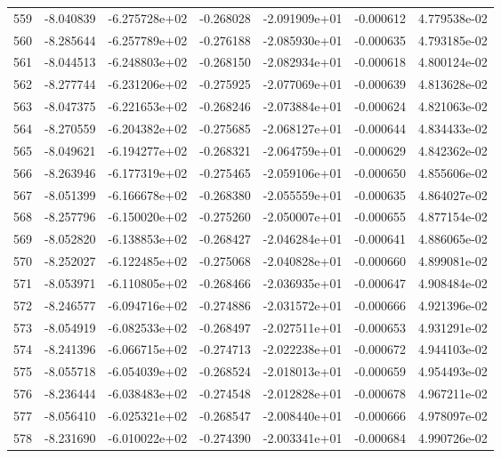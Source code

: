 \begin{tabular}{rrrrrrr}
 559 &  -8.040839 & -6.275728e+02 & -0.268028 & -2.091909e+01 &   -0.000612 &  4.779538e-02 \\
 560 &  -8.285644 & -6.257789e+02 & -0.276188 & -2.085930e+01 &   -0.000635 &  4.793185e-02 \\
 561 &  -8.044513 & -6.248803e+02 & -0.268150 & -2.082934e+01 &   -0.000618 &  4.800124e-02 \\
 562 &  -8.277744 & -6.231206e+02 & -0.275925 & -2.077069e+01 &   -0.000639 &  4.813628e-02 \\
 563 &  -8.047375 & -6.221653e+02 & -0.268246 & -2.073884e+01 &   -0.000624 &  4.821063e-02 \\
 564 &  -8.270559 & -6.204382e+02 & -0.275685 & -2.068127e+01 &   -0.000644 &  4.834433e-02 \\
 565 &  -8.049621 & -6.194277e+02 & -0.268321 & -2.064759e+01 &   -0.000629 &  4.842362e-02 \\
 566 &  -8.263946 & -6.177319e+02 & -0.275465 & -2.059106e+01 &   -0.000650 &  4.855606e-02 \\
 567 &  -8.051399 & -6.166678e+02 & -0.268380 & -2.055559e+01 &   -0.000635 &  4.864027e-02 \\
 568 &  -8.257796 & -6.150020e+02 & -0.275260 & -2.050007e+01 &   -0.000655 &  4.877154e-02 \\
 569 &  -8.052820 & -6.138853e+02 & -0.268427 & -2.046284e+01 &   -0.000641 &  4.886065e-02 \\
 570 &  -8.252027 & -6.122485e+02 & -0.275068 & -2.040828e+01 &   -0.000660 &  4.899081e-02 \\
 571 &  -8.053971 & -6.110805e+02 & -0.268466 & -2.036935e+01 &   -0.000647 &  4.908484e-02 \\
 572 &  -8.246577 & -6.094716e+02 & -0.274886 & -2.031572e+01 &   -0.000666 &  4.921396e-02 \\
 573 &  -8.054919 & -6.082533e+02 & -0.268497 & -2.027511e+01 &   -0.000653 &  4.931291e-02 \\
 574 &  -8.241396 & -6.066715e+02 & -0.274713 & -2.022238e+01 &   -0.000672 &  4.944103e-02 \\
 575 &  -8.055718 & -6.054039e+02 & -0.268524 & -2.018013e+01 &   -0.000659 &  4.954493e-02 \\
 576 &  -8.236444 & -6.038483e+02 & -0.274548 & -2.012828e+01 &   -0.000678 &  4.967211e-02 \\
 577 &  -8.056410 & -6.025321e+02 & -0.268547 & -2.008440e+01 &   -0.000666 &  4.978097e-02 \\
 578 &  -8.231690 & -6.010022e+02 & -0.274390 & -2.003341e+01 &   -0.000684 &  4.990726e-02 \\

\end{tabular}
